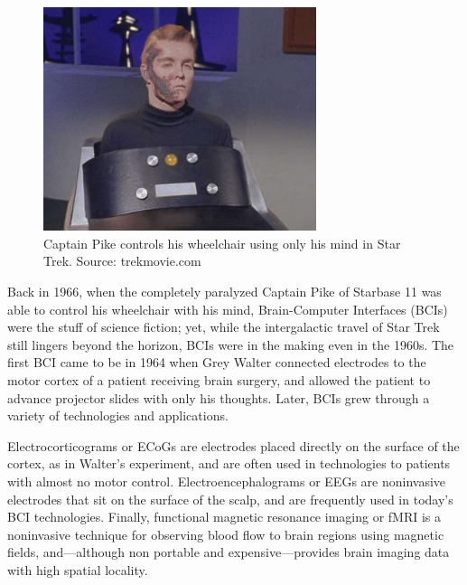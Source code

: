 \documentclass[12pt]{report}
\begin{document}
	\begin{figure}[t]
		\includegraphics[width=8cm]{startrek}
		\centering
		\caption{Captain Pike controls his wheelchair using only his mind in Star Trek. Source: trekmovie.com }
	\end{figure}

	Back in 1966, when the completely paralyzed Captain Pike of Starbase 11 was able to control his wheelchair with his mind, Brain-Computer Interfaces (BCIs) were the stuff of science fiction; yet, while the intergalactic travel of Star Trek still lingers beyond the horizon, BCIs were in the making even in the 1960\textquotesingle s.  The first BCI came to be in 1964 when Grey Walter connected electrodes to the motor cortex of a patient receiving brain surgery, and allowed the patient to advance projector slides with only his thoughts\cite{Graimann}.  Later, BCIs grew through a variety of technologies and applications.
	
	Electrocorticograms 	or ECoGs are electrodes placed directly on the surface of the cortex, as in Walter's experiment, and are often used in technologies to patients with almost no motor control\cite{Graimann}.  Electroencephalograms or EEGs are noninvasive electrodes that sit on the surface of the scalp, and are frequently used in today's BCI technologies.  Finally, functional magnetic resonance imaging or fMRI is a noninvasive technique for observing blood flow to brain regions using magnetic fields, and---although non portable and expensive---provides brain imaging data with high spatial locality\cite{fmri}.  
	
\end{document}
